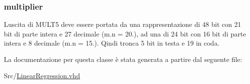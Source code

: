 \subsubsection[{\texorpdfstring{mult6}{mult6}}]{ {\bfseries \textcolor{vhdlchar}{multiplier}\textcolor{vhdlchar}{ }} \hspace{0.3cm}{\ttfamily [Instantiation]}}\hypertarget{class_linear_regression_1_1_structural_afa25d32bbc0881baaa179e393e1964c5}{}\label{class_linear_regression_1_1_structural_afa25d32bbc0881baaa179e393e1964c5}
L\textquotesingle{}uscita di M\+U\+L\+T5 deve essere portata da una rappresentazione di 48 bit con 21 bit di parte intera e 27 decimale (m.\+n = 20.), ad una di 24 bit con 16 bit di parte intera e 8 decimale (m.\+n = 15.). Qindi tronca 5 bit in testa e 19 in coda. 

La documentazione per questa classe è stata generata a partire dal seguente file\+:\begin{DoxyCompactItemize}
\item 
Src/\hyperlink{_linear_regression_8vhd}{Linear\+Regression.\+vhd}\end{DoxyCompactItemize}
